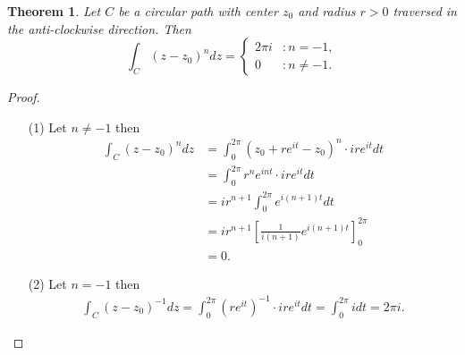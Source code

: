 \documentclass[12pt,openany]{book}
\newtheorem{theorem}{Theorem}[chapter]
\theoremstyle{definition}
\newcommand{\of}[1]{\left( #1 \right)}
\begin{document}
	\newpage
	\begin{tcolorbox}[colframe=thmcolor, title={\color{white}\bf An Important Integral}]
		\begin{theorem}
			Let $C$ be a circular path with center $z_0$ and radius $r>0$ traversed in the anti-clockwise direction. Then \[
			\int_C\of{z-z_0}^ndz=\begin{cases}
			2\pi i &:n= -1,\\
			0 &:n\neq -1.
			\end{cases}
			\]
		\end{theorem}
	\end{tcolorbox}
	\begin{proof}
		\begin{itemize}
			\item[(1)] Let $n\neq -1$ then
			\begin{align*}
			\int_C\of{z-z_0}^ndz&=\int_0^{2\pi}\of{z_0+re^{it}-z_0}^n\cdot ire^{it}dt\\
			&=\int_0^{2\pi}r^ne^{i nt}\cdot ire^{it}dt\\
			&=ir^{n+1}\int_0^{2\pi}e^{i(n+1)t}dt\\
			&=ir^{n+1}\left[\frac{1}{i(n+1)}e^{i(n+1)t}\right]_0^{2\pi}\\
			&=0.
			\end{align*}
			\item[(2)] Let $n = -1$ then
			\begin{align*}
			\int_C\of{z-z_0}^{-1}dz=\int_0^{2\pi}\of{re^{it}}^{-1}\cdot ire^{it}dt
			=\int_0^{2\pi}i dt
			=2\pi i.
			\end{align*}
		\end{itemize}
	\end{proof}
	\vspace{4pt}
\end{document}
